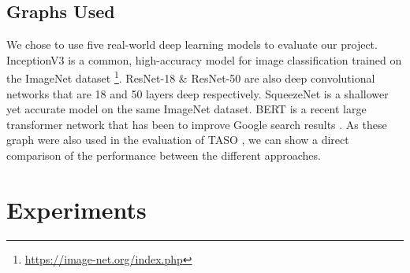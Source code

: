 \subsection{Graphs Used}
\label{sec:eval:subsec:graphsused}

\begin{table}[htbp]
  \centering
  \caption[Properties of evaluation graphs]{Properties of the five evaluation graphs used in the experiments contained in this chapter. We differentiate the total number of layers in a network from the number of unique layers used in composing the network to provide a more accurate representation of its complexity.}
  \label{table:eval:graph-props}
\end{table}

We chose to use five real-world deep learning models to evaluate our project. InceptionV3 \cite{szegedy2015rethinking} is a common, high-accuracy model for image classification trained on the ImageNet dataset \footnote{\url{https://image-net.org/index.php}}. ResNet-18 \& ResNet-50 \cite{he2015deep} are also deep convolutional networks that are 18 and 50 layers deep respectively. SqueezeNet \cite{iandola2016squeezenet} is a shallower yet accurate model on the same ImageNet dataset. BERT \cite{devlin2019bert} is a recent large transformer network that has been to improve Google search results \cite{nayak2019}. As these graph were also used in the evaluation of TASO \cite{jia2019taso}, we can show a direct comparison of the performance between the different approaches.

\section{Experiments}

